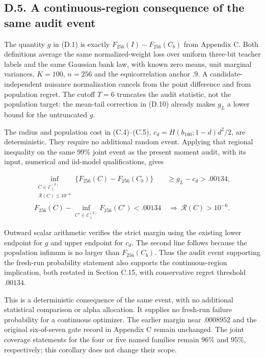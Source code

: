 \documentclass{article}
\begin{document}
\subsection*{D.5. A continuous-region consequence of the same audit
event}\label{d.5.-a-continuous-region-consequence-of-the-same-audit-event}

The quantity \(g\) in (D.1) is exactly \(F_{256}(I)-F_{256}(C_b)\) from
Appendix C. Both definitions average the same normalized-weight loss
over uniform three-bit teacher labels and the same Gaussian bank law,
with known zero means, unit marginal variances, \(K=100\), \(n=256\) and
the equicorrelation anchor \(.9\). A candidate-independent nuisance
normalization cancels from the point difference and from population
regret. The cutoff \(T=6\) truncates the audit statistic, not the
population target: the mean-tail correction in (D.10) already makes
\(g_L\) a lower bound for the untruncated \(g\).

The radius and population cost in (C.4)--(C.5),
\(c_d=H(b_{100};1-d)d^2/2\), are deterministic. They require no
additional random event. Applying that regional inequality on the same
99\% joint event as the present moment audit, with its input, numerical
and iid-model qualifications, gives

\[
\begin{aligned}
\inf_{\substack{C\in\mathcal E_{.1}^{(3)}\\\mathcal R(C)\le10^{-6}}}
\{F_{256}(C)-F_{256}(C_b)\}
&\ge g_L-c_d>.00134,\\
F_{256}(C)-\inf_{C'\in\mathcal E_{.1}^{(3)}}F_{256}(C')<.00134
&\ \Longrightarrow\ \mathcal R(C)>10^{-6}.
\end{aligned}
\tag{D.14}
\]

Outward scalar arithmetic verifies the strict margin using the existing
lower endpoint for \(g\) and upper endpoint for \(c_d\). The second line
follows because the population infimum is no larger than
\(F_{256}(C_b)\). Thus the audit event supporting the fresh-run
probability statement also supports the continuous-region implication,
both restated in Section C.15, with conservative regret threshold
\(.00134\).

This is a deterministic consequence of the same event, with no
additional statistical comparison or alpha allocation. It supplies no
fresh-run failure probability for a continuous optimizer. The earlier
margin near \(.0008952\) and the original six-of-seven gate record in
Appendix C remain unchanged. The joint coverage statements for the four
or five named families remain 96\% and 95\%, respectively; this
corollary does not change their scope.
\end{document}
